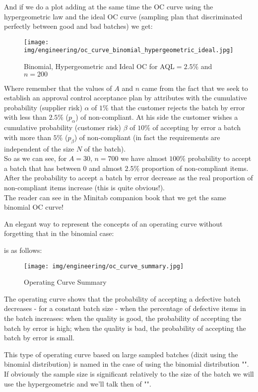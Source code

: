 	\begin{tcolorbox}[colframe=black,colback=white,sharp corners]
	And if we do a plot adding at the same time the OC curve using the hypergeometric law and the ideal OC curve (sampling plan that discriminated perfectly between good and bad batches) we get:
	\begin{figure}[H]
		\centering
		\texttt{[image: img/engineering/oc\_curve\_binomial\_hypergeometric\_ideal.jpg]}
		\caption{Binomial, Hypergeometric and Ideal OC for AQL$=2.5\%$ and $n=200$}	
	\end{figure}
	Where remember that the values of $A$ and $n$ came from the fact that we seek to establish an approval control acceptance plan by attributes with the cumulative probability (supplier risk) $\alpha$ of $1\%$ that the customer rejects the batch by error with less than $2.5\%$ ($p_\alpha$) of non-compliant. At his side the customer wishes a cumulative probability (customer risk) $\beta$ of $10\%$ of accepting by error a batch with more than $5\%$ ($p_\beta$) of non-compliant (in fact the requirements are independent of the size $N$ of the batch).\\
	
	So as we can see, for $A=30$, $n=700$ we have almost $100\%$ probability to accept a batch that has between $0$ and almost $2.5\%$ proportion of non-compliant items. After the probability to accept a batch by error decrease as the real proportion of non-compliant items increase (this is quite obvious!).\\
	
	The reader can see in the Minitab companion book that we get the same binomial OC curve!
	\end{tcolorbox}
	An elegant way to represent the concepts of an operating curve without forgetting that in the binomial case:
	
	is as follows:
	\begin{figure}[H]
		\centering
		\texttt{[image: img/engineering/oc\_curve\_summary.jpg]}
		\caption{Operating Curve Summary}	
	\end{figure}
	The operating curve shows that the probability of accepting a defective batch decreases - for a constant batch size - when the percentage of defective items in the batch increases: when the quality is good, the probability of accepting the batch by error is high; when the quality is bad, the probability of accepting the batch by error is small.
	
	This type of operating curve based on large sampled  batches (dixit using the binomial distribution) is named in the case of using the binomial distribution "". If obviously the sample size is significant relatively to the size of the batch we will use the hypergeometric and we'll talk then of "".


